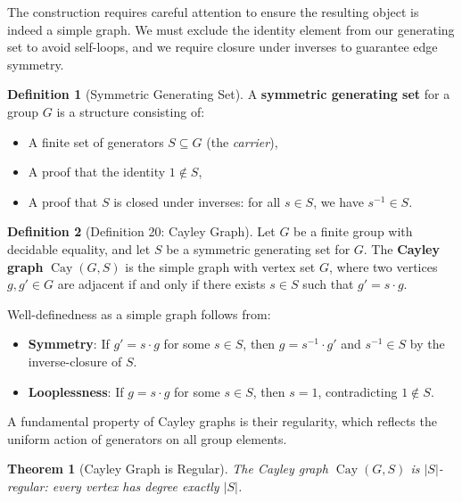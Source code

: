 \documentclass[11pt]{article}
\theoremstyle{plain}
\newtheorem*{theorem}{Theorem}
\theoremstyle{definition}
\newtheorem*{definition}{Definition}
\theoremstyle{remark}
\begin{document}
The construction requires careful attention to ensure the resulting object is indeed a simple graph. We must exclude the identity element from our generating set to avoid self-loops, and we require closure under inverses to guarantee edge symmetry.

\begin{definition}[Symmetric Generating Set]
A \textbf{symmetric generating set} for a group $G$ is a structure consisting of:
\begin{itemize}
  \item A finite set of generators $S \subseteq G$ (the \textit{carrier}),
  \item A proof that the identity $1 \notin S$,
  \item A proof that $S$ is closed under inverses: for all $s \in S$, we have $s^{-1} \in S$.
\end{itemize}
\end{definition}

\begin{definition}[Definition 20: Cayley Graph]
Let $G$ be a finite group with decidable equality, and let $S$ be a symmetric generating set for $G$. The \textbf{Cayley graph} $\operatorname{Cay}(G, S)$ is the simple graph with vertex set $G$, where two vertices $g, g' \in G$ are adjacent if and only if there exists $s \in S$ such that $g' = s \cdot g$.

Well-definedness as a simple graph follows from:
\begin{itemize}
  \item \textbf{Symmetry}: If $g' = s \cdot g$ for some $s \in S$, then $g = s^{-1} \cdot g'$ and $s^{-1} \in S$ by the inverse-closure of $S$.
  \item \textbf{Looplessness}: If $g = s \cdot g$ for some $s \in S$, then $s = 1$, contradicting $1 \notin S$.
\end{itemize}
\end{definition}

A fundamental property of Cayley graphs is their regularity, which reflects the uniform action of generators on all group elements.

\begin{theorem}[Cayley Graph is Regular]
The Cayley graph $\operatorname{Cay}(G, S)$ is $|S|$-regular: every vertex has degree exactly $|S|$.
\end{theorem}
\end{document}
